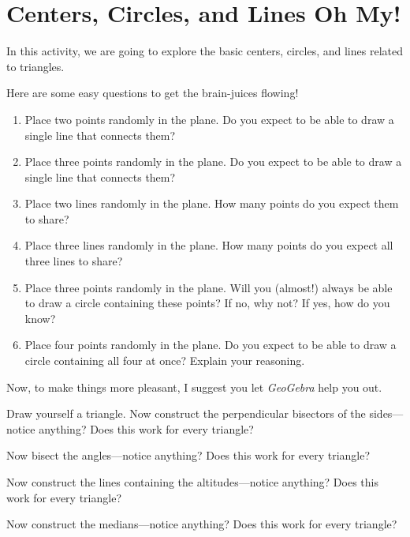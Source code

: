 \newpage
\section{Centers, Circles, and Lines Oh My!}

In this activity, we are going to explore the basic centers, circles,
and lines related to triangles. 

\begin{prob} Here are some easy questions to get the brain-juices flowing!
\begin{enumerate} 
\item Place two points randomly in the plane. Do you expect to be able to
draw a single line that connects them?
\item Place three points randomly in the plane. Do you expect to be able to
draw a single line that connects them?
\item Place two lines randomly in the plane. How many points do you expect
them to share?
\item Place three lines randomly in the plane. How many points do you expect
all three lines to share?
\item Place three points randomly in the plane. Will you (almost!) always be
able to draw a circle containing these points? If no, why not? If yes,
how do you know?
\item Place four points randomly in the plane. Do you expect to be able to
draw a circle containing all four at once? Explain your reasoning.
\end{enumerate}
\end{prob}


Now, to make things more pleasant, I suggest you let \textsl{GeoGebra}
help you out.

\begin{prob} 
Draw yourself a triangle. Now construct the perpendicular bisectors of
the sides---notice anything? Does this work for every triangle?
\end{prob}

\begin{prob}
Now bisect the angles---notice anything? Does this work for every
triangle?
\end{prob}

\begin{prob}
Now construct the lines containing the altitudes---notice anything?
Does this work for every triangle?
\end{prob}

\begin{prob}
Now construct the medians---notice anything? Does this work for every
triangle?
\end{prob}

